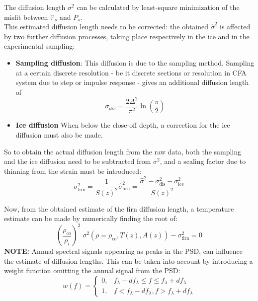 \documentclass[../../CompleteThesis/Complete_1stDraft.tex]{subfiles}
\begin{document}
The diffusion length $\sigma^2$ can be calculated by least-square minimization of the misfit between $\mathbb{P}_s$ and $P_s$.\\
This estimated diffusion length needs to be corrected: the obtained $\hat{\sigma}^2$ is affected by two further diffusion processes, taking place respectively in the ice and in the experimental sampling:
\begin{itemize}
	\item \textbf{Sampling diffusion}: This diffusion is due to the sampling method. Sampling at a certain discrete resolution - be it discrete sections or resolution in CFA system due to step or impulse response - gives an additional diffusion length of
	\begin{equation}
		\sigma_{dis} = \frac{2 \Delta^2}{\pi^2}\ln\left(\frac{\pi}{2}\right)
		\label{eq:Diff_Len_corr_Discrete}
	\end{equation}
	\item \textbf{Ice diffusion} When below the close-off depth, a correction for the ice diffusion must also be made.
\end{itemize} 

So to obtain the actual diffusion length from the raw data, both the sampling and the ice diffusion need to be subtracted from $\sigma^2$, and a scaling factor due to thinning from the strain must be introduced:
\begin{equation}
	\sigma_{\text{firn}}^2 = \frac{1}{S(z)^2}\hat{\sigma}_{\text{firn}}^2 = \frac{\hat{\sigma}^2 - \sigma_{\text{dis}}^2 - \sigma_{\text{ice}}^2}{S(z)^2}
	\label{eq:Diff_Len_Firn_Corrected}
\end{equation}

Now, from the obtained estimate of the firn diffusion length, a temperature estimate can be made by numerically finding the root of:
\begin{equation}
	\left(\frac{\rho_{co}}{\rho_i}\right)^2\;\sigma^2(\rho=\rho_{co}, T(z),A(z)) - \sigma_{\text{firn}}^2 = 0
	\label{eq:Firn_Temp_est_Roots}
\end{equation}
\textbf{NOTE:} Annual spectral signals appearing as peaks in the PSD, can influence the  estimate of diffusion lengths. This can be taken into account by introducing a weight function omitting the annual signal from the PSD:
\begin{equation}
	w(f) = \begin{cases}
		0, & f_{\lambda} - d f_{\lambda} \leq f \leq f_{\lambda} + d f_{\lambda} \\
		1, & f < f_{\lambda} - d f_{\lambda}, f > f_{\lambda} + d f_{\lambda}
	\end{cases}
\end{equation}
\end{document}
